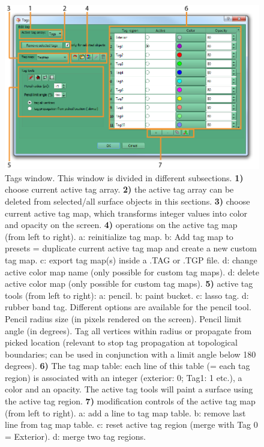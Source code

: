 \begin{figure}
  \centering
  \includegraphics[scale=1]{images/12/tags_window2.png}
\caption{Tags window. This window is divided in different subsections. \textbf{1)} choose current active tag array.  \textbf{2)} the active tag array can be deleted from selected/all surface objects in this sections. \textbf{3)} choose current active tag map, which transforms integer values into color and opacity on the screen. \textbf{4)} operations on the active tag map (from left to right). a: reinitialize tag map. b: Add tag map to presets = duplicate current active tag map and create a new custom tag map. c: export tag map(s) inside a .TAG or .TGP file. d: change active color map name (only possible for custom tag maps). d: delete active color map (only possible for custom tag maps). \textbf{5)} active tag tools (from left to right): a: pencil. b: paint bucket. c: lasso tag. d: rubber band tag. Different options are available for the pencil tool. Pencil radius size (in pixels rendered on the screen). Pencil limit angle (in degrees). Tag all vertices within radius or propagate from picked location (relevant to stop tag propagation at topological boundaries; can be used in conjunction with a limit angle below 180 degrees).  \textbf{6)} The tag map table: each line of this table (= each tag region) is associated with an integer (exterior: 0; Tag1: 1 etc.), a color and an opacity. The active tag tools will paint a surface using the active tag region. \textbf{7)} modification controls of the active tag map (from left to right). a: add a line to tag map table. b: remove last line from tag map table. c: reset active tag region (merge with Tag 0 = Exterior). d: merge two tag regions.}	
\label{tags_window}
 \end{figure}



